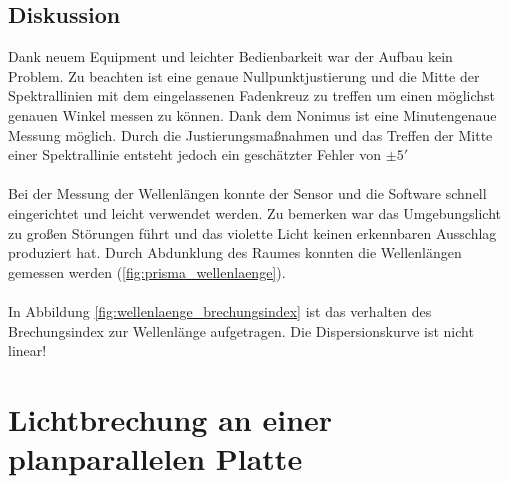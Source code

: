 \documentclass[12pt,a4paper]{article}
\begin{document}
\begin{multicols}{2}

\subsection{Diskussion}
Dank neuem Equipment und leichter Bedienbarkeit war der Aufbau kein Problem. Zu beachten ist eine genaue Nullpunktjustierung und die Mitte der Spektrallinien mit dem eingelassenen Fadenkreuz zu treffen um einen möglichst genauen Winkel messen zu können. Dank dem Nonimus ist eine Minutengenaue Messung möglich. Durch die Justierungsmaßnahmen und das Treffen der Mitte einer Spektrallinie entsteht jedoch ein geschätzter Fehler von $\pm 5'$\\
\\
Bei der Messung der Wellenlängen konnte der Sensor und die Software schnell eingerichtet und leicht verwendet werden. Zu bemerken war das Umgebungslicht zu großen Störungen führt und das violette Licht keinen erkennbaren Ausschlag produziert hat. Durch Abdunklung des Raumes konnten die Wellenlängen gemessen werden (\ref{fig:prisma_wellenlaenge}).\\
\\
In Abbildung \ref{fig:wellenlaenge_brechungsindex} ist das verhalten des Brechungsindex zur Wellenlänge aufgetragen. Die Dispersionskurve ist nicht linear!

\section{Lichtbrechung an einer planparallelen Platte}


\end{multicols}
\end{document}
